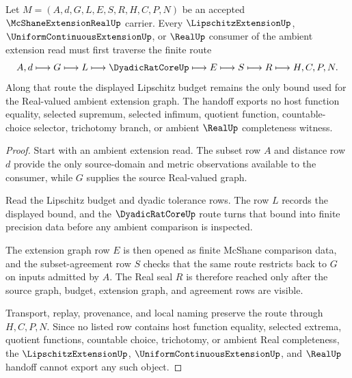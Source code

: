 \begin{theorem}
\label{thm:mcshane-extension-real-lipschitz-handoff}
Let $M=(A,d,G,L,E,S,R,H,C,P,N)$ be an accepted $\McShaneExtensionRealUp$ carrier. Every $\LipschitzExtensionUp$, $\UniformContinuousExtensionUp$, or $\RealUp$ consumer of the ambient extension read must first traverse the finite route
$$
A,d\longmapsto G\longmapsto L\longmapsto \DyadicRatCoreUp\longmapsto E\longmapsto S\longmapsto R\longmapsto H,C,P,N .
$$
Along that route the displayed Lipschitz budget remains the only bound used for the Real-valued ambient extension graph. The handoff exports no host function equality, selected supremum, selected infimum, quotient function, countable-choice selector, trichotomy branch, or ambient $\RealUp$ completeness witness.
\end{theorem}
\begin{proof}
Start with an ambient extension read. The subset row $A$ and distance row $d$ provide the only source-domain and metric observations available to the consumer, while $G$ supplies the source Real-valued graph.

Read the Lipschitz budget and dyadic tolerance rows. The row $L$ records the displayed bound, and the $\DyadicRatCoreUp$ route turns that bound into finite precision data before any ambient comparison is inspected.

The extension graph row $E$ is then opened as finite McShane comparison data, and the subset-agreement row $S$ checks that the same route restricts back to $G$ on inputs admitted by $A$. The Real seal $R$ is therefore reached only after the source graph, budget, extension graph, and agreement rows are visible.

Transport, replay, provenance, and local naming preserve the route through $H,C,P,N$. Since no listed row contains host function equality, selected extrema, quotient functions, countable choice, trichotomy, or ambient Real completeness, the $\LipschitzExtensionUp$, $\UniformContinuousExtensionUp$, and $\RealUp$ handoff cannot export any such object.
\end{proof}



